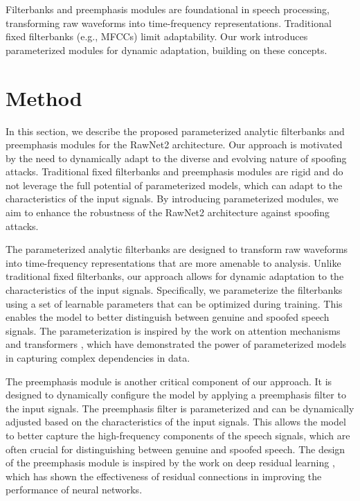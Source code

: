 \documentclass{article} %
\begin{document}
Filterbanks and preemphasis modules are foundational in speech processing, transforming raw waveforms into time-frequency representations. Traditional fixed filterbanks (e.g., MFCCs) limit adaptability. Our work introduces parameterized modules for dynamic adaptation, building on these concepts.

\section{Method}
\label{sec:method}
In this section, we describe the proposed parameterized analytic filterbanks and preemphasis modules for the RawNet2 architecture. Our approach is motivated by the need to dynamically adapt to the diverse and evolving nature of spoofing attacks. Traditional fixed filterbanks and preemphasis modules are rigid and do not leverage the full potential of parameterized models, which can adapt to the characteristics of the input signals. By introducing parameterized modules, we aim to enhance the robustness of the RawNet2 architecture against spoofing attacks.

The parameterized analytic filterbanks are designed to transform raw waveforms into time-frequency representations that are more amenable to analysis. Unlike traditional fixed filterbanks, our approach allows for dynamic adaptation to the characteristics of the input signals. Specifically, we parameterize the filterbanks using a set of learnable parameters that can be optimized during training. This enables the model to better distinguish between genuine and spoofed speech signals. The parameterization is inspired by the work on attention mechanisms \citep{vaswani2017attention} and transformers \citep{dosovitskiy2020image}, which have demonstrated the power of parameterized models in capturing complex dependencies in data.

The preemphasis module is another critical component of our approach. It is designed to dynamically configure the model by applying a preemphasis filter to the input signals. The preemphasis filter is parameterized and can be dynamically adjusted based on the characteristics of the input signals. This allows the model to better capture the high-frequency components of the speech signals, which are often crucial for distinguishing between genuine and spoofed speech. The design of the preemphasis module is inspired by the work on deep residual learning \citep{he2016deep}, which has shown the effectiveness of residual connections in improving the performance of neural networks.
\end{document}
